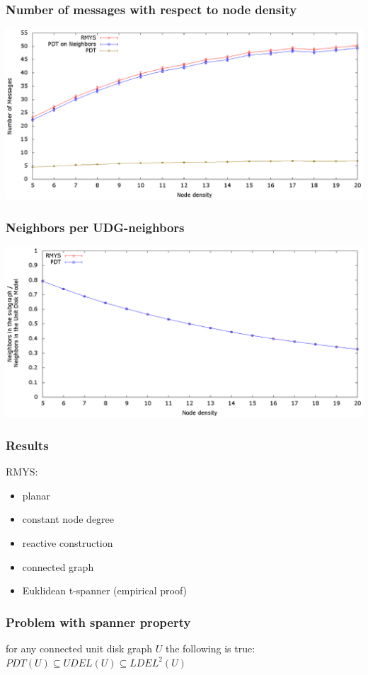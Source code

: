 \documentclass[compress]{beamer}
\begin{document}
\begin{frame} 
\frametitle{Number of messages with respect to node density}
\center	\includegraphics[width=1.0\linewidth]{RMYS_PDT_Neighbors.eps}
\end{frame}

\begin{frame} 
\frametitle{Neighbors per UDG-neighbors}
\center	\includegraphics[width=1.0\linewidth]{RMYS_PDT_UDGNeighborsRatio.eps}
\end{frame}

\begin{frame}
\frametitle{Results}
RMYS:
\begin{itemize}
\item planar
\item constant node degree
\item reactive construction
\item connected graph
\item Euklidean t-spanner (empirical proof)
\end{itemize}
\end{frame}

\begin{frame}
\frametitle{Problem with spanner property}
\center for any connected unit disk graph $U $ the following is true:
\center $PDT(U) \subseteq UDEL(U) \subseteq LDEL^2(U) $
\end{frame}
\end{document}
